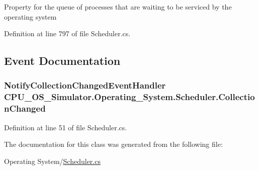 Property for the queue of processes that are waiting to be serviced by the operating system 



Definition at line 797 of file Scheduler.\+cs.



\subsection{Event Documentation}
\hypertarget{class_c_p_u___o_s___simulator_1_1_operating___system_1_1_scheduler_a13cc271f1cf9b76d1cbc87988c45e1fb}{}
\subsubsection[{Collection\+Changed}]{\setlength{\rightskip}{0pt plus 5cm}Notify\+Collection\+Changed\+Event\+Handler C\+P\+U\+\_\+\+O\+S\+\_\+\+Simulator.\+Operating\+\_\+\+System.\+Scheduler.\+Collection\+Changed}\label{class_c_p_u___o_s___simulator_1_1_operating___system_1_1_scheduler_a13cc271f1cf9b76d1cbc87988c45e1fb}


Definition at line 51 of file Scheduler.\+cs.



The documentation for this class was generated from the following file\+:\begin{DoxyCompactItemize}
\item 
Operating System/\hyperlink{_scheduler_8cs}{Scheduler.\+cs}\end{DoxyCompactItemize}
